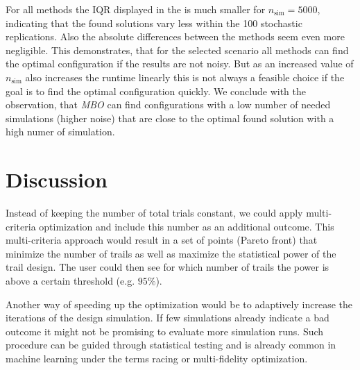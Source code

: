\documentclass[bimj,fleqn]{w-art}
\theoremstyle{plain}
\theoremstyle{definition}
\begin{document}
For all methods the IQR displayed in the is much smaller for $n_\text{sim} = 5000$, indicating that the found solutions vary less within the 100 stochastic replications.
Also the absolute differences between the methods seem even more negligible.
This demonstrates, that for the selected scenario all methods can find the optimal configuration if the results are not noisy.
But as an increased value of $n_\text{sim}$ also increases the runtime linearly this is not always a feasible choice if the goal is to find the optimal configuration quickly.
We conclude with the observation, that \emph{MBO} can find configurations with a low number of needed simulations (higher noise) that are close to the optimal found solution with a high numer of simulation.





\section{Discussion}
\label{sec:discussion}



Instead of keeping the number of total trials constant, we could apply multi-criteria optimization and include this number as an additional outcome.
This multi-criteria approach would result in a set of points (Pareto front) that minimize the number of trails as well as maximize the statistical power of the trail design.
The user could then see for which number of trails the power is above a certain threshold (e.g. $95\%$).

Another way of speeding up the optimization would be to adaptively increase the iterations of the design simulation. 
If few simulations already indicate a bad outcome it might not be promising to evaluate more simulation runs.
Such procedure can be guided through statistical testing and is already common in machine learning under the terms racing or multi-fidelity optimization.
\end{document}
